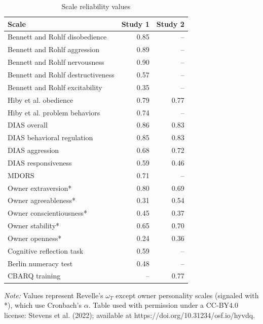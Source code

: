 \documentclass[
  pub,floatsintext]{apa6}
\begin{document}
\begin{table}[!h]

\caption{\label{tab:reliability}Scale reliability values}
\centering
\begin{threeparttable}
\begin{tabular}[t]{lrr}
\toprule
Scale & Study 1 & Study 2\\
\midrule
Bennett and Rohlf disobedience & 0.85 & --\\
Bennett and Rohlf aggression & 0.89 & --\\
Bennett and Rohlf nervousness & 0.90 & --\\
Bennett and Rohlf destructiveness & 0.57 & --\\
Bennett and Rohlf excitability & 0.35 & --\\
Hiby et al. obedience & 0.79 & 0.77\\
Hiby et al. problem behaviors & 0.74 & --\\
DIAS overall & 0.86 & 0.83\\
DIAS behavioral regulation & 0.85 & 0.83\\
DIAS aggression & 0.68 & 0.72\\
DIAS responsiveness & 0.59 & 0.46\\
MDORS & 0.71 & --\\
Owner extraversion* & 0.80 & 0.69\\
Owner agreeableness* & 0.31 & 0.54\\
Owner conscientiousness* & 0.45 & 0.37\\
Owner stability* & 0.65 & 0.70\\
Owner openness* & 0.24 & 0.36\\
Cognitive reflection task & 0.59 & --\\
Berlin numeracy test & 0.48 & --\\
CBARQ training & -- & 0.77\\
\bottomrule
\end{tabular}
\begin{tablenotes}
\item \newline\textit{Note: }  Values represent Revelle's $\omega_{T}$ except owner personality scales (signaled with *), which use Cronbach's $\alpha$. Table used with permission under a CC-BY4.0 license: Stevens et al. (2022); available at https://doi.org/10.31234/osf.io/hyvdq.
\end{tablenotes}
\end{threeparttable}
\end{table}
\end{document}
